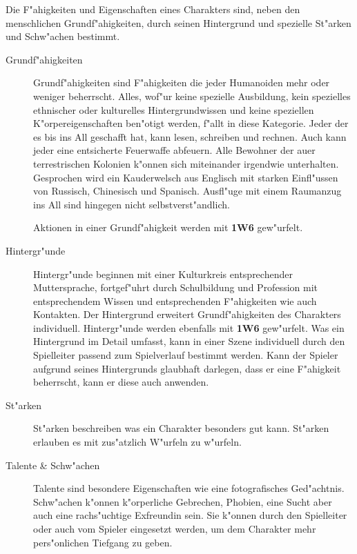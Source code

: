 
Die F"ahigkeiten und Eigenschaften eines Charakters sind, neben den menschlichen Grundf"ahigkeiten, durch seinen Hintergrund und spezielle St"arken und Schw"achen bestimmt. 

\begin{description}
    \item[Grundf"ahigkeiten] Grundf"ahigkeiten sind F"ahigkeiten die jeder Humanoiden mehr oder weniger beherrscht. Alles, wof"ur keine
        spezielle Ausbildung, kein spezielles ethnischer oder kulturelles Hintergrundwissen und keine speziellen K"orpereigenschaften ben"otigt werden, f"allt in diese Kategorie. Jeder der es bis ins All geschafft hat, kann lesen, schreiben und rechnen. Auch kann jeder eine entsicherte Feuerwaffe abfeuern. Alle Bewohner der au\3er terrestrischen Kolonien k"onnen sich miteinander irgendwie unterhalten. Gesprochen wird ein Kauderwelsch aus Englisch mit starken Einfl"ussen von Russisch, Chinesisch und Spanisch. Ausfl"uge mit einem Raumanzug ins All sind hingegen nicht selbstverst"andlich. 
        
        Aktionen in einer Grundf"ahigkeit werden mit \textbf{1W6} gew"urfelt. 
    \item[Hintergr"unde] Hintergr"unde beginnen mit einer Kulturkreis entsprechender Muttersprache, fortgef"uhrt durch Schulbildung und 
        Profession mit entsprechendem Wissen und entsprechenden F"ahigkeiten wie auch Kontakten. Der Hintergrund erweitert Grundf"ahigkeiten des Charakters individuell. Hintergr"unde werden ebenfalls mit \textbf{1W6} gew"urfelt. Was ein Hintergrund im Detail umfasst, kann in einer Szene individuell durch den Spielleiter passend zum Spielverlauf bestimmt werden. Kann der Spieler aufgrund seines Hintergrunds glaubhaft darlegen, dass er eine F"ahigkeit beherrscht, kann er diese auch anwenden.
    \item[St"arken] St"arken beschreiben was ein Charakter besonders gut kann. St"arken erlauben es mit zus"atzlich W"urfeln zu w"urfeln. 
    \item[Talente \& Schw"achen] Talente sind besondere Eigenschaften wie eine fotografisches Ged"achtnis. Schw"achen k"onnen k"orperliche  
        Gebrechen, Phobien, eine Sucht aber auch eine rachs"uchtige Exfreundin sein. Sie k"onnen durch den Spielleiter oder auch vom Spieler eingesetzt werden, um dem Charakter mehr pers"onlichen Tiefgang zu geben.
\end{description}        
